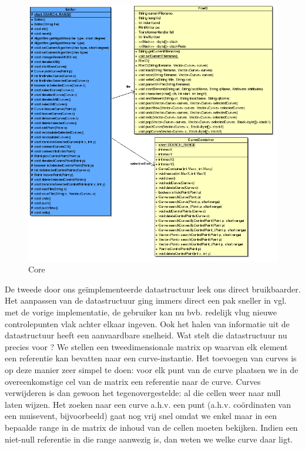 \documentclass[a4paper,11pt,oneside, titlepage]{article}
\begin{document}
\begin{figure}[htbp]
\centering
\includegraphics[scale=0.6]{./UML2/Core.png}
\caption{Core}\label{iCore}
\end{figure}
De tweede door ons ge\"implementeerde datastructuur leek ons direct bruikbaarder. Het aanpassen van de datastructuur ging immers direct een pak sneller in vgl.
met de vorige implementatie, de gebruiker kan nu bvb. redelijk vlug nieuwe controlepunten vlak achter elkaar ingeven. Ook het halen van informatie uit de datastructuur heeft een aanvaardbare snelheid.
Wat stelt die datastructuur nu precies voor ? We stellen een tweedimensionale matrix op waarvan elk element een referentie kan bevatten naar een curve-instantie.
Het toevoegen van curves is op deze manier zeer simpel te doen: voor elk punt van de curve plaatsen we in de overeenkomstige cel van de matrix een referentie naar de curve.
Curves verwijderen is dan gewoon het tegenovergestelde: al die cellen weer naar null laten wijzen. Het zoeken naar een curve a.h.v. een punt (a.h.v. co\"ordinaten van een muisevent, bijvoorbeeld) 
gaat nog vrij snel omdat we enkel maar in een bepaalde range in de matrix de inhoud van de cellen moeten bekijken. Indien een niet-null referentie in die range aanwezig is, dan weten we welke curve
daar ligt.\newline \newline
\end{document}
